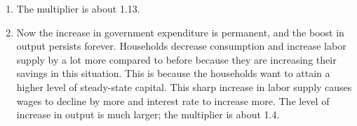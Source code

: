 \documentclass[11pt]{amsart}
\begin{document}
\begin{enumerate}[label = (\alph*)]
	\item
	The multiplier is about 1.13.

	\item
	Now the increase in government expenditure is permanent, and the boost in output persists forever. Households decrease consumption and increase labor supply by a lot more compared to before because they are increasing their savings in this situation. This is because the households want to attain a higher level of steady-state capital. This sharp increase in labor supply causes wages to decline by more and interest rate to increase more. The level of increase in output is much larger; the multiplier is about 1.4.
\end{enumerate}
\end{document}

